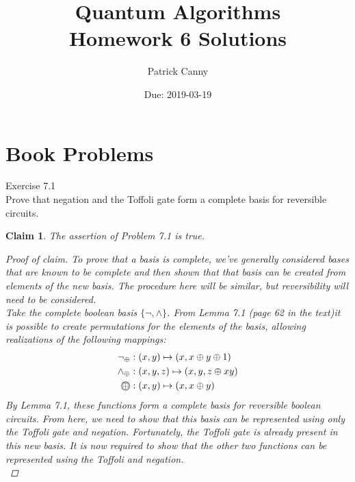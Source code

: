 \documentclass{exam} %
\theoremstyle{plain}
\newtheorem{claim}[thm]{Claim}      \newtheorem*{claim*}{Claim}
\theoremstyle{definition}
\theoremstyle{remark}
\newenvironment{claimproof} {
  \begin{proof}[Proof of claim]
  \renewcommand{\qedsymbol}{\ensuremath{\bullet}}
  } {
  \end{proof}
  }
\numberwithin{equation}{section}  %
\newcommand\ooplus{\stackMath\mathbin{\stackinset{c}{0ex}{c}{0ex}{\oplus}{\bigcirc}}}
\begin{document}
  
\printanswers
\title{Quantum Algorithms \\ Homework 6 Solutions}
\author{Patrick Canny}
\date{Due: 2019-03-19}
\maketitle
\thispagestyle{foot}
\section{Book Problems}
\begin{questions}
  \question Exercise 7.1\\
  Prove that negation and the Toffoli gate form a complete basis for reversible
  circuits.
  \begin{solution}
    \begin{claim} The assertion of Problem 7.1 is true.
      \begin{claimproof}
        To prove that a basis is complete, we've generally considered bases that
        are known to be complete and then shown that that basis can be created
        from elements of the new basis. The procedure here will be similar, 
        but reversibility will need to be considered.\\

        Take the complete boolean basis $\{\neg, \wedge\}$. From Lemma 7.1
        (page 62 in the text)it is possible to create permutations 
        for the elements of the basis, allowing realizations of the 
        following mappings:
        \begin{align*}
          \neg_{\oplus} &: (x, y) \mapsto (x, x \oplus y \oplus 1)\\
          \wedge_{\oplus} &: (x, y, z) \mapsto (x, y, z \oplus xy) \\
          \ooplus &: (x, y) \mapsto (x, x\oplus y) \\
        \end{align*}
        By Lemma 7.1, these functions form a complete basis for reversible 
        boolean circuits. From here, we need to show that this basis can be 
        represented using only
        the Toffoli gate and negation. Fortunately, the Toffoli gate is already
        present in this new basis. It is now required to show that the other two
        functions can be represented using the Toffoli and negation.\\


\end{claimproof}
\end{claim}
\end{solution}
\end{questions}
\end{document}
